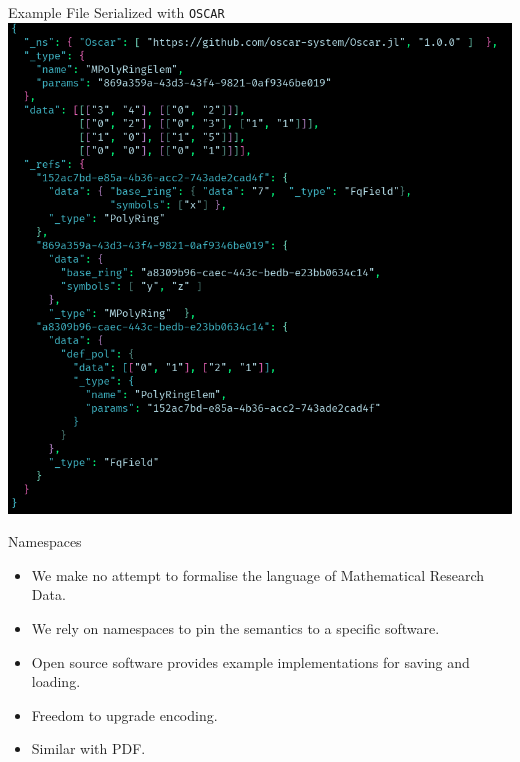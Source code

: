 \documentclass[9pt]{beamer}
\newcommand\OSCAR{\texttt{OSCAR}\xspace}
\theoremstyle{definition}
\begin{document}
\begin{frame}[fragile]{Example File Serialized with \OSCAR}
  \includegraphics[height=0.9\textheight]{images/polynomial-example}
\end{frame}


\begin{frame}[fragile]{Namespaces}
  \begin{itemize}
  \item We make no attempt to formalise the language of Mathematical Research Data.
  \item We rely on namespaces to pin the semantics to a specific software.
  \item Open source software provides example implementations for saving and loading.
  \item Freedom to upgrade encoding.
  \item Similar with PDF.
  \end{itemize}
\end{frame}

\end{document}
